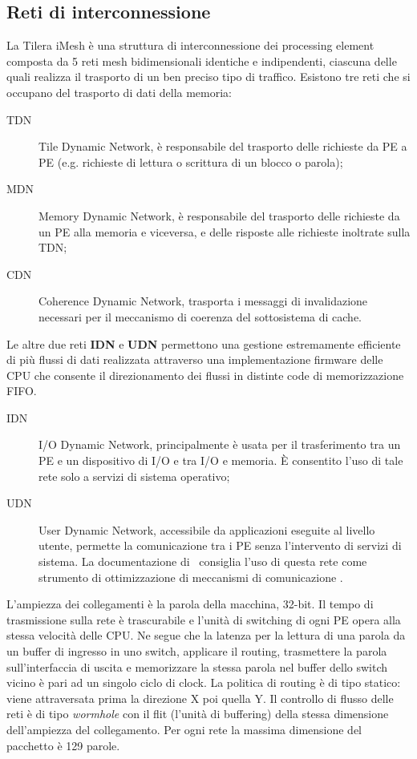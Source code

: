 \subsection{Reti di interconnessione}
\label{sct:intro_arch_interc_networks}
La Tilera iMesh \cite{4378780} \`e una struttura di interconnessione dei processing element composta da 5 reti mesh bidimensionali identiche e indipendenti, ciascuna delle quali realizza il trasporto di un ben preciso tipo di traffico. Esistono tre reti che si occupano del trasporto di dati della memoria:
\begin{description}
\item [TDN] Tile Dynamic Network, \`e responsabile del trasporto delle richieste da PE a PE (e.g. richieste di lettura o scrittura di un blocco o parola);
\item [MDN] Memory Dynamic Network, \`e responsabile del trasporto delle richieste da un PE alla memoria e viceversa, e delle risposte alle richieste inoltrate sulla TDN; 
\item [CDN] Coherence Dynamic Network, trasporta i messaggi di invalidazione necessari per il meccanismo di coerenza del sottosistema di cache.
\end{description}
Le altre due reti \textbf{IDN} e \textbf{UDN} permettono una gestione estremamente efficiente di pi\`u flussi di dati realizzata attraverso una implementazione firmware delle CPU che consente il direzionamento dei flussi in distinte code di memorizzazione FIFO.
\begin{description}
\item [IDN] I/O Dynamic Network, principalmente \`e usata per il trasferimento tra un PE e un dispositivo di I/O e tra I/O e memoria. \`E consentito l'uso di tale rete solo a servizi di sistema operativo;
\item [UDN] User Dynamic Network, accessibile da applicazioni eseguite al livello utente, permette la comunicazione tra i PE senza l'intervento di servizi di sistema. La documentazione di \tile\ consiglia l'uso di questa rete come strumento di ottimizzazione di meccanismi di comunicazione \cite{ug120}.
\end{description}
L'ampiezza dei collegamenti \`e la parola della macchina, 32-bit. Il tempo di trasmissione sulla rete \`e trascurabile e l'unit\`a di switching di ogni PE opera alla stessa velocit\`a delle CPU. Ne segue che la latenza per la lettura di una parola da un buffer di ingresso in uno switch, applicare il routing, trasmettere la parola sull'interfaccia di uscita e memorizzare la stessa parola nel buffer dello switch vicino \`e pari ad un singolo ciclo di clock. La politica di routing \`e di tipo statico: viene attraversata prima la direzione X poi quella Y. Il controllo di flusso delle reti \`e di tipo \emph{wormhole} con il flit (l'unit\`a di buffering) della stessa dimensione dell'ampiezza del collegamento. Per ogni rete la massima dimensione del pacchetto \`e 129 parole. 
